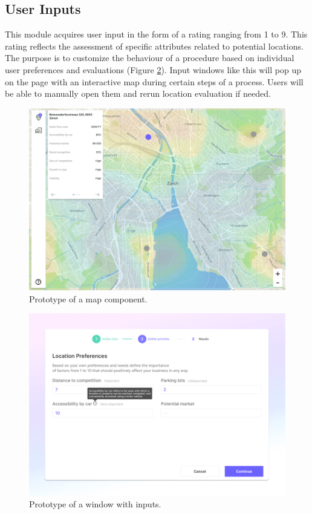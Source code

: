 \subsection{User Inputs}

This module acquires user input in the form of a rating ranging from 1 to 9. This rating reflects the assessment of specific attributes related to potential locations. The purpose is to customize the behaviour of a procedure based on individual user preferences and evaluations (Figure \ref{fig:location-attributes}). Input windows like this will pop up on the page with an interactive map during certain steps of a process. Users will be able to manually open them and rerun location evaluation if needed.

\begin{figure}[ht]\centering
  \centering
  \includegraphics[width=0.9\linewidth]{obrazky-figures/ch5/map.png}
  \caption{Prototype of a map component.}
  \label{fig:map-prototype}
\end{figure}

\begin{figure}[ht]\centering
  \centering
  \includegraphics[width=0.9\linewidth]{obrazky-figures/ch5/config-prototype.png}
  \caption{Prototype of a window with inputs.}
  \label{fig:location-attributes}
\end{figure}